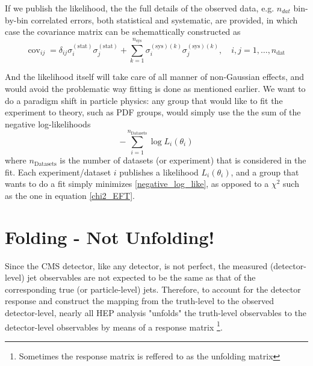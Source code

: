 If we publish the likelihood, the the full details of the observed data, e.g. $n_{dat}$ bin-by-bin correlated errors, both statistical and systematic, are provided, in which case the covariance matrix can be schemattically constructed as 
\begin{equation}
    \operatorname{cov}_{i j}=\delta_{i j} \sigma_{i}^{(\mathrm{stat})} \sigma_{j}^{(\mathrm{stat})}+\sum_{k=1}^{n_{\mathrm{sys}}} \sigma_{i}^{(\mathrm{sys})(k)} \sigma_{j}^{(\mathrm{sys})(k)}, \quad i, j=1, \ldots, n_{\text {dat }}
    \label{cov_binbybin}
\end{equation}


And the likelihood itself will take care of all manner of non-Gaussian effects, and would avoid the problematic way fitting is done as mentioned earlier. We want to do a paradigm shift in particle physics: any group that would like to fit the experiment to theory, such as PDF groups, would simply use the the sum of the negative log-likelihoods
\begin{equation}
    - \sum_{i=1}^{n_{\text{Datasets}}} \log L_i(\theta_i)
    \label{negative_log_like}
\end{equation}
where $n_{\text{Datasets}}$ is the number of datasets (or experiment) that is considered in the fit. Each experiment/dataset $i$ publishes a likelihood $L_i(\theta_i)$, and a group that wants to do a fit simply minimizes \ref{negative_log_like}, as opposed to a $\chi^2$ such as the one in equation \ref{chi2_EFT}.













\section{Folding - Not Unfolding!}
Since the CMS detector, like any detector, is not perfect, the measured (detector-level) jet observables are not expected to be the same as that of the corresponding true (or particle-level) jets. Therefore, to account for the detector response and construct the mapping from the truth-level to the observed detector-level, nearly all HEP analysis "unfolds" the truth-level observables to the detector-level observables by means of a response matrix \footnote{Sometimes the response matrix is reffered to as the unfolding matrix }.

